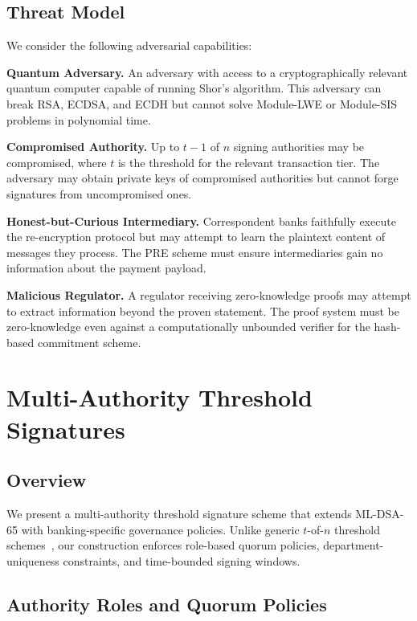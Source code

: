 \documentclass[conference,10pt]{IEEEtran}
\begin{document}
\subsection{Threat Model}

We consider the following adversarial capabilities:

\textbf{Quantum Adversary.} An adversary with access to a cryptographically relevant quantum computer capable of running Shor's algorithm. This adversary can break RSA, ECDSA, and ECDH but cannot solve Module-LWE or Module-SIS problems in polynomial time.

\textbf{Compromised Authority.} Up to $t-1$ of $n$ signing authorities may be compromised, where $t$ is the threshold for the relevant transaction tier. The adversary may obtain private keys of compromised authorities but cannot forge signatures from uncompromised ones.

\textbf{Honest-but-Curious Intermediary.} Correspondent banks faithfully execute the re-encryption protocol but may attempt to learn the plaintext content of messages they process. The PRE scheme must ensure intermediaries gain no information about the payment payload.

\textbf{Malicious Regulator.} A regulator receiving zero-knowledge proofs may attempt to extract information beyond the proven statement. The proof system must be zero-knowledge even against a computationally unbounded verifier for the hash-based commitment scheme.

\section{Multi-Authority Threshold Signatures}

\subsection{Overview}

We present a multi-authority threshold signature scheme that extends ML-DSA-65 with banking-specific governance policies. Unlike generic $t$-of-$n$ threshold schemes~\cite{shamir1979share}, our construction enforces role-based quorum policies, department-uniqueness constraints, and time-bounded signing windows.

\subsection{Authority Roles and Quorum Policies}
\end{document}
